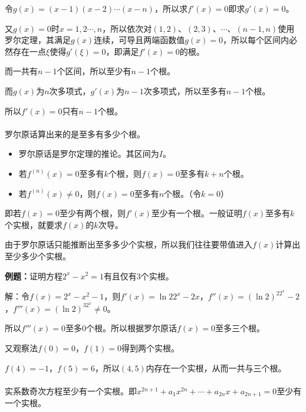 令$g(x)=(x-1)(x-2)\cdots(x-n)$，所以求$f'(x)=0$即求$g'(x)=0$。

又$g(x)=0$时$x=1,2\cdots,n$，所以依次对$(1,2)$、$(2,3)$、$\cdots$、$(n-1,n)$使用罗尔定理，其满足$g(x)$连续，可导且两端函数值$g(x)=0$，所以每个区间内必然存在一点$\xi$使得$g'(\xi)=0$，即满足$f'(x)=0$的根。

而一共有$n-1$个区间，所以至少有$n-1$个根。

而$g(x)$为$n$次多项式，$g'(x)$为$n-1$次多项式，所以至多有$n-1$个根。

所以$f'(x)=0$只有$n-1$个根。

\paragraph{} \leavevmode \medskip

罗尔原话算出来的是至多有多少个根。

\begin{itemize}
    \item 罗尔原话是罗尔定理的推论。其区间为$I$。
    \item 若$f^{(n)}(x)=0$至多有$k$个根，则$f(x)=0$至多有$k+n$个根。
    \item 若$f^{(n)}(x)\neq0$，则$f(x)=0$至多有$n$个根。（令$k=0$）
\end{itemize}

即若$f(x)=0$至少有两个根，则$f'(x)$至少有一个根。一般证明$f(x)$至多有$k$个实根，就要求$f(x)$的$k$次导。

由于罗尔原话只能推断出至多多少个实根，所以我们往往要带值进入$f(x)$计算出至少多少个实根。

\textbf{例题：}证明方程$2^x-x^2=1$有且仅有3个实根。

解：令$f(x)=2^x-x^2-1$，则$f'(x)=\ln22^x-2x$，$f''(x)=(\ln2)^22^x-2$，$f'''(x)=(\ln2)^32^x\neq 0$。

所以$f'''(x)=0$至多0个根。所以根据罗尔原话$f(x)=0$至多三个根。

又观察法$f(0)=0$，$f(1)=0$得到两个实根。

$f(4)=-1$，$f(5)=6$，所以$(4,5)$内存在一个实根，从而一共与三个根。

\paragraph{} \leavevmode \medskip

实系数奇次方程至少有一个实根。即$x^{2n+1}+a_1x^{2n}+\cdots+a_{2n}x+a_{2n+1}=0$至少有一个实根。

